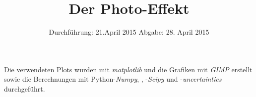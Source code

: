 
\subject{Anfängerpraktikum V500}
\title{Der Photo-Effekt}
\date{
  Durchführung: 21.April 2015
  \hspace{3em}
  Abgabe: 28. April 2015
}


\maketitle
\thispagestyle{empty}
\newpage





\printbibliography
\noindent Die verwendeten Plots wurden mit \textit{matplotlib}\cite{matplotlib} und die Grafiken mit \textit{GIMP}\cite{gimp} erstellt sowie die Berechnungen mit Python-\textit{Numpy}, \cite{numpy}, -\textit{Scipy}\cite{scipy} und -\textit{uncertainties}\cite{uncertainties} durchgeführt.
